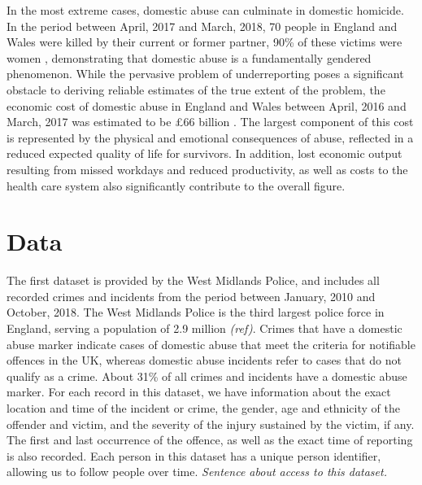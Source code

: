 \documentclass[11pt, a4paper]{article}
\begin{document}
In the most extreme cases, domestic abuse can culminate in domestic homicide. In the period between April, 2017 and March, 2018, 70 people in England and Wales were killed by their current or former partner, 90\% of these victims were women \cite{homic}, demonstrating that domestic abuse is a fundamentally gendered phenomenon. While the pervasive problem of underreporting poses a significant obstacle to deriving reliable estimates of the true extent of the problem, the economic cost of domestic abuse in England and Wales between April, 2016 and March, 2017 was estimated to be \pounds 66 billion \cite{costs}. The largest component of this cost is represented by the physical and emotional consequences of abuse, reflected in a reduced expected quality of life for survivors. In addition, lost economic output resulting from missed workdays and reduced productivity, as well as costs to the health care system also significantly contribute to the overall figure. 




\newpage


\section{Data}


The first dataset is provided by the West Midlands Police, and includes all recorded crimes and incidents from the period between January, 2010 and October, 2018. The West Midlands Police is the third largest police force in England, serving a population of 2.9 million \textit{(ref)}. Crimes that have a domestic abuse marker indicate cases of domestic abuse that meet the criteria for notifiable offences in the UK, whereas domestic abuse incidents refer to cases that do not qualify as a crime. About 31\% of all crimes and incidents have a domestic abuse marker. For each record in this dataset, we have information about the exact location and time of the incident or crime, the gender, age and ethnicity of the offender and victim, and the severity of the injury sustained by the victim, if any. The first and last occurrence of the offence, as well as the exact time of reporting is also recorded. Each person in this dataset has a unique person identifier, allowing us to follow people over time. \textit{Sentence about access to this dataset.}
\end{document}

